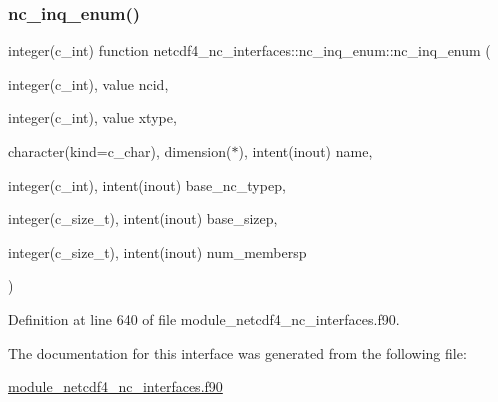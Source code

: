\subsubsection{\texorpdfstring{nc\+\_\+inq\+\_\+enum()}{nc\_inq\_enum()}}
{\footnotesize\ttfamily integer(c\+\_\+int) function netcdf4\+\_\+nc\+\_\+interfaces\+::nc\+\_\+inq\+\_\+enum\+::nc\+\_\+inq\+\_\+enum (\begin{DoxyParamCaption}\item[{integer(c\+\_\+int), value}]{ncid,  }\item[{integer(c\+\_\+int), value}]{xtype,  }\item[{character(kind=c\+\_\+char), dimension($\ast$), intent(inout)}]{name,  }\item[{integer(c\+\_\+int), intent(inout)}]{base\+\_\+nc\+\_\+typep,  }\item[{integer(c\+\_\+size\+\_\+t), intent(inout)}]{base\+\_\+sizep,  }\item[{integer(c\+\_\+size\+\_\+t), intent(inout)}]{num\+\_\+membersp }\end{DoxyParamCaption})}



Definition at line 640 of file module\+\_\+netcdf4\+\_\+nc\+\_\+interfaces.\+f90.



The documentation for this interface was generated from the following file\+:\begin{DoxyCompactItemize}
\item 
\hyperlink{module__netcdf4__nc__interfaces_8f90}{module\+\_\+netcdf4\+\_\+nc\+\_\+interfaces.\+f90}\end{DoxyCompactItemize}
